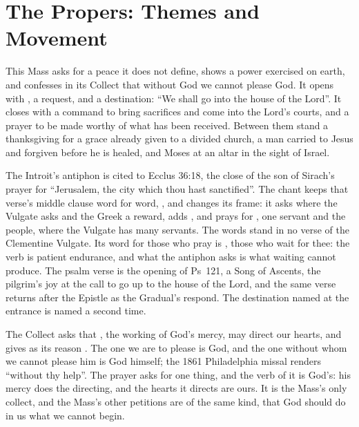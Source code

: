 
\section{The Propers: Themes and Movement}

This Mass asks for a peace it does not define, shows a power exercised on
earth, and confesses in its Collect that without God we cannot please God. It opens with , a request, and a destination: ``We shall
go into the house of the Lord''. It closes with a command to bring sacrifices
and come into the Lord's courts, and a prayer to be made worthy of what has
been received. Between them stand a thanksgiving for a grace already given to a
divided church, a man carried to Jesus and forgiven before he is healed, and
Moses at an altar in the sight of Israel.

The Introit's antiphon is cited to Ecclus 36:18, the close of the son of
Sirach's prayer for ``Jerusalem, the city which thou hast sanctified''. The
chant keeps that verse's middle clause word for word, , and changes its frame: it asks  where the
Vulgate asks  and the Greek a reward, adds , and
prays for , one servant and the people,
where the Vulgate has many servants. The words  stand in no
verse of the Clementine Vulgate. Its word for those who pray is
, those who wait for thee: the verb is patient
endurance, and what the antiphon asks is what waiting cannot produce. The psalm verse is the opening of Ps~121, a
Song of Ascents, the pilgrim's joy at the call to go up to the house of the
Lord, and the same verse returns after the Epistle as the Gradual's respond. The
destination named at the entrance is named a second time.

The Collect asks that , the working of God's
mercy, may direct our hearts, and gives as its reason . The one we are to please is God, and the one without
whom we cannot please him is God himself; the 1861 Philadelphia missal renders
 ``without thy help''. The prayer asks for one thing, and the
verb of it is God's: his mercy does the directing, and the hearts it directs are
ours. It is the Mass's only collect, and the Mass's other petitions are of the
same kind, that God should do in us what we cannot begin.

